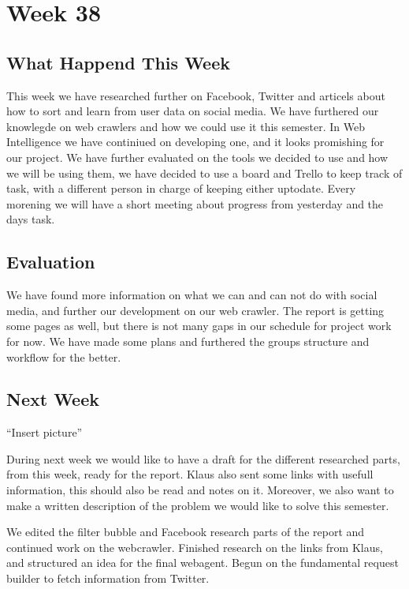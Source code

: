 \section*{Week 38}
\subsection*{What Happend This Week}
This week we have researched further on Facebook, Twitter and articels about
how to sort and learn from user data on social media. We have furthered our
knowlegde on web crawlers and how we could use it this semester. In Web
Intelligence we have continiued on developing one, and it looks promishing for
our project. We have further evaluated on the tools we decided to use and how we
will be using them, we have decided to use a board and Trello to keep track of
task, with a different person in charge of keeping either uptodate. Every
morening we will have a short meeting about progress from yesterday and the days
task.

\subsection*{Evaluation}
We have found more information on what we can and can not do with social media,
and further our development on our web crawler. The report is getting some pages
as well, but there is not many gaps in our schedule for project work for now. We
have made some plans and furthered the groups structure and workflow for the
better.

\subsection*{Next Week}

``Insert picture''







During next week we would like to have a draft for the different researched
parts, from this week, ready for the report. Klaus also sent some links with
usefull information, this should also be read and notes on it. Moreover, we also
want to make a written description of the problem we would like to solve this
semester.





We edited the filter bubble and Facebook research parts of the report and continued work on the webcrawler. 
Finished research on the links from Klaus, and structured an idea for the final webagent.
Begun on the fundamental request builder to fetch information from Twitter.
